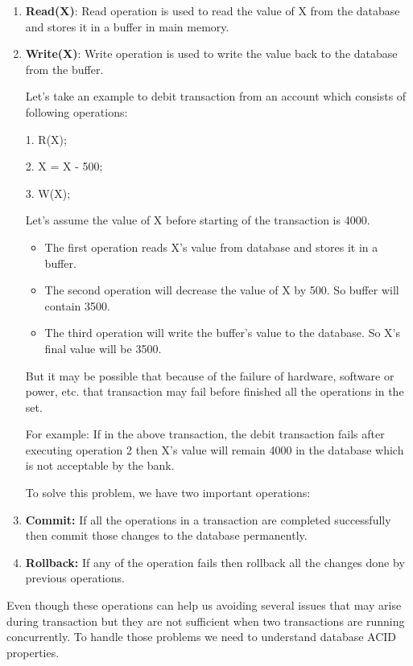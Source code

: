 \documentclass{article}
\begin{document}
\begin{enumerate}


\item \textbf{Read(X)}: Read operation is used to read the value of X from the database and stores it in a buffer in main memory.

\item \textbf{Write(X)}: Write operation is used to write the value back to the database from the buffer.

Let's take an example to debit transaction from an account which consists of following operations:

1.  R(X); 
 
2.  X = X - 500;  

3.  W(X);  

Let's assume the value of X before starting of the transaction is 4000.
\begin{itemize}

\item The first operation reads X's value from database and stores it in a buffer.
\item The second operation will decrease the value of X by 500. So buffer will contain 3500.
\item The third operation will write the buffer's value to the database. So X's final value will be 3500.
\end{itemize}

But it may be possible that because of the failure of hardware, software or power, etc. that transaction may fail before finished all the operations in the set.

For example: If in the above transaction, the debit transaction fails after executing operation 2 then X's value will remain 4000 in the database which is not acceptable by the bank.

To solve this problem, we have two important operations:

\item \textbf{Commit:}  If all the operations in a transaction are completed successfully then commit those changes to the database permanently. 

\item \textbf{Rollback:}  If any of the operation fails then rollback all the changes done by previous
operations. 

\end{enumerate}

Even though these operations can help us avoiding several issues that may arise during
transaction but they are not sufficient when two transactions are running concurrently. To
handle those problems we need to understand database ACID properties.
\end{document}
